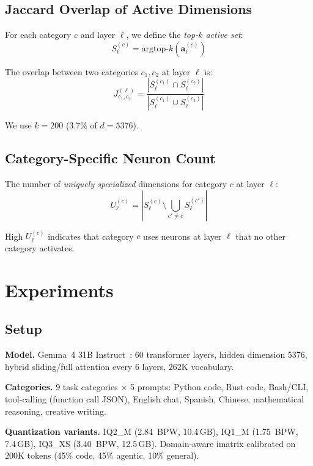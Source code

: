 \documentclass[11pt,a4paper]{article}
\begin{document}
\subsection{Jaccard Overlap of Active Dimensions}

For each category $c$ and layer $\ell$, we define the \emph{top-$k$ active set}:
\begin{equation}
S^{(c)}_\ell = \text{argtop-}k\left(\mathbf{a}^{(c)}_\ell\right)
\end{equation}

The overlap between two categories $c_1, c_2$ at layer $\ell$ is:
\begin{equation}
J^{(\ell)}_{c_1, c_2} = \frac{|S^{(c_1)}_\ell \cap S^{(c_2)}_\ell|}{|S^{(c_1)}_\ell \cup S^{(c_2)}_\ell|}
\end{equation}

We use $k = 200$ (3.7\% of $d = 5376$).

\subsection{Category-Specific Neuron Count}

The number of \emph{uniquely specialized} dimensions for category $c$ at layer $\ell$:
\begin{equation}
U^{(c)}_\ell = \left| S^{(c)}_\ell \setminus \bigcup_{c' \neq c} S^{(c')}_\ell \right|
\end{equation}

High $U^{(c)}_\ell$ indicates that category $c$ uses neurons at layer $\ell$ that no other category activates.

\section{Experiments}

\subsection{Setup}

\textbf{Model.} Gemma~4 31B Instruct~\citep{gemma4}: 60 transformer layers, hidden dimension 5376, hybrid sliding/full attention every 6 layers, 262K vocabulary.

\textbf{Categories.} 9 task categories $\times$ 5 prompts: Python code, Rust code, Bash/CLI, tool-calling (function call JSON), English chat, Spanish, Chinese, mathematical reasoning, creative writing.

\textbf{Quantization variants.} IQ2\_M (2.84~BPW, 10.4\,GB), IQ1\_M (1.75~BPW, 7.4\,GB), IQ3\_XS (3.40~BPW, 12.5\,GB). Domain-aware imatrix calibrated on 200K tokens (45\% code, 45\% agentic, 10\% general).
\end{document}

